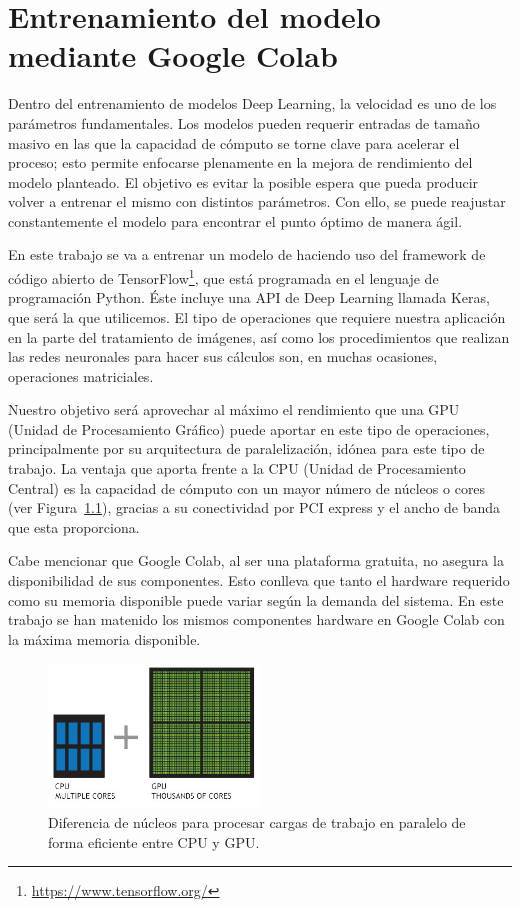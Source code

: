 \mbox{}


\chapter{Entrenamiento del modelo mediante Google Colab}
\label{ch:chapter2}
Dentro del entrenamiento de modelos Deep Learning\cite{advanced_convolutional_network}, la velocidad es uno de los parámetros fundamentales.
Los modelos pueden requerir entradas de tamaño masivo en las que la capacidad de cómputo se torne clave para acelerar el proceso;
esto permite enfocarse plenamente en la mejora de rendimiento del modelo planteado.
El objetivo es evitar la posible espera que pueda producir volver a entrenar el mismo con distintos parámetros.
Con ello, se puede reajustar constantemente el modelo para encontrar el punto óptimo de manera ágil.

En este trabajo se va a entrenar un modelo de  haciendo uso del framework de código abierto de TensorFlow\footnote{\url{https://www.tensorflow.org/}}, que está programada en el lenguaje de programación Python.
Éste incluye una API de Deep Learning llamada Keras, que será la que utilicemos.
El tipo de operaciones que requiere nuestra aplicación en la parte del tratamiento de imágenes, así como los procedimientos que realizan las redes neuronales\cite{neural_network} para hacer sus cálculos son, en muchas ocasiones,
operaciones matriciales.

Nuestro objetivo será aprovechar al máximo el rendimiento que una GPU (Unidad de Procesamiento Gráfico) puede aportar en este tipo de operaciones, principalmente por su arquitectura de paralelización, idónea para este tipo de trabajo.
La ventaja que aporta frente a la CPU (Unidad de Procesamiento Central) es la capacidad de cómputo con un mayor número de núcleos o cores (ver Figura~\ref{fig:Arquitectura de paralelización de una GPU}), gracias a su conectividad por PCI express y el ancho de banda que esta proporciona.

Cabe mencionar que Google Colab, al ser una plataforma gratuita, no asegura la disponibilidad de sus componentes.
Esto conlleva que tanto el hardware requerido como su memoria disponible puede variar según la demanda del sistema.
En este trabajo se han matenido los mismos componentes hardware en Google Colab con la máxima memoria disponible.
\begin{figure}
    \centering
    \includegraphics[width=0.5\textwidth]{images/chapter2/cpu-and-gpu.jpg}
    \caption{Diferencia de núcleos para procesar cargas de trabajo en paralelo de forma eficiente entre CPU y GPU.}
    \label{fig:Arquitectura de paralelización de una GPU}
\end{figure}


